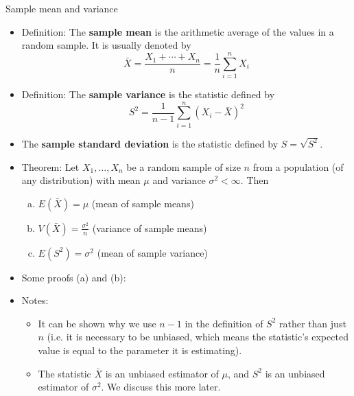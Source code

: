 \documentclass{article}
\newcommand{\vecn}[2]{#1_1, \ldots, #1_{#2}}	%
\begin{document}
Sample mean and variance\bigskip
\begin{itemize}
    \item Definition: The \textbf{sample mean} is the arithmetic average of the values in a random sample. It is usually denoted by
    \[\bar{X} = \frac{X_1 + \cdots + X_n}{n} = \frac{1}{n} \sum_{i = 1}^n X_i\]
    \item Definition: The \textbf{sample variance} is the statistic defined by
    \[S^2 = \frac{1}{n - 1} \sum_{i = 1}^n (X_i - \bar{X})^2\]
    \item[] The \textbf{sample standard deviation} is the statistic defined by $S = \sqrt{S^2}$.\bigskip
    \item Theorem: Let $\vecn{X}{n}$ be a random sample of size $n$ from a population (of any distribution) with mean $\mu$ and variance $\sigma^2 < \infty$. Then\bigskip
    \begin{enumerate}[(a)]
        \item \hspace{30pt} $E(\bar{X}) = \mu$ \hspace{30pt} (mean of sample means)
        \item \hspace{30pt} $\displaystyle V(\bar{X}) = \frac{\sigma^2}{n}$ \hspace{30pt} (variance of sample means)
        \item \hspace{30pt} $E(S^2) = \sigma^2$ \hspace{30pt} (mean of sample variance)
    \end{enumerate}\bigskip
    \item[] Some proofs (a) and (b):\vspace{200pt}
    \item Notes:
    \begin{itemize}
        \item It can be shown why we use $n - 1$ in the definition of $S^2$ rather than just $n$ (i.e. it is necessary to be unbiased, which means the statistic's expected value is equal to the parameter it is estimating).\vspace{20pt}
        \item The statistic $\bar{X}$ is an unbiased estimator of $\mu$, and $S^2$ is an unbiased estimator of $\sigma^2$. We discuss this more later.
    \end{itemize}
\end{itemize}\bigskip
\end{document}

